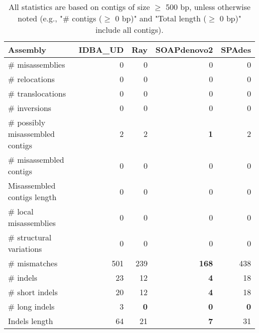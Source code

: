 \documentclass[12pt,a4paper]{article}
\begin{document}
\begin{table}[ht]
\begin{center}
\caption{All statistics are based on contigs of size $\geq$ 500 bp, unless otherwise noted (e.g., "\# contigs ($\geq$ 0 bp)" and "Total length ($\geq$ 0 bp)" include all contigs).}
\begin{tabular}{|l*{4}{|r}|}
\hline
Assembly & IDBA\_UD & Ray & SOAPdenovo2 & SPAdes \\ \hline
\# misassemblies & 0 & 0 & 0 & 0 \\ \hline
\hspace{5mm}\# relocations & 0 & 0 & 0 & 0 \\ \hline
\hspace{5mm}\# translocations & 0 & 0 & 0 & 0 \\ \hline
\hspace{5mm}\# inversions & 0 & 0 & 0 & 0 \\ \hline
\# possibly misassembled contigs & 2 & 2 & {\bf 1} & 2 \\ \hline
\# misassembled contigs & 0 & 0 & 0 & 0 \\ \hline
Misassembled contigs length & 0 & 0 & 0 & 0 \\ \hline
\# local misassemblies & 0 & 0 & 0 & 0 \\ \hline
\# structural variations & 0 & 0 & 0 & 0 \\ \hline
\# mismatches & 501 & 239 & {\bf 168} & 438 \\ \hline
\# indels & 23 & 12 & {\bf 4} & 18 \\ \hline
\hspace{5mm}\# short indels & 20 & 12 & {\bf 4} & 18 \\ \hline
\hspace{5mm}\# long indels & 3 & {\bf 0} & {\bf 0} & {\bf 0} \\ \hline
Indels length & 64 & 21 & {\bf 7} & 31 \\ \hline
\end{tabular}
\end{center}
\end{table}
\end{document}
